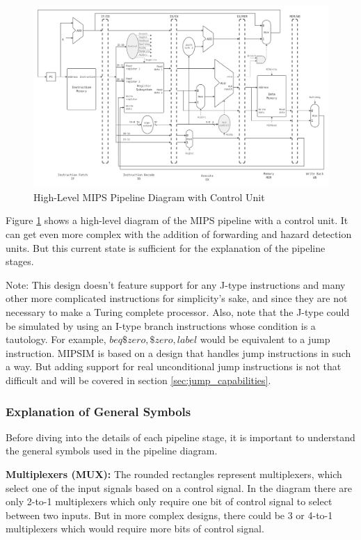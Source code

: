 \begin{figure}[H]
    \centering
    \includegraphics[width=1\textwidth]{assets/images/mips_pipeline.png}
    \caption{High-Level MIPS Pipeline Diagram with Control Unit}
    \label{fig:mips_pipeline}
\end{figure}

Figure \ref{fig:mips_pipeline} shows a high-level diagram of the MIPS pipeline with a control unit. It can get even more complex with the addition of forwarding and hazard detection units. But this current state is sufficient for the explanation of the pipeline stages.

Note: This design doesn't feature support for any J-type instructions and many other more complicated instructions for simplicity’s sake, and since they are not necessary to make a Turing complete processor. Also, note that the J-type could be simulated by using an I-type branch instructions whose condition is a tautology. For example, $beq \$zero, \$zero, label$ would be equivalent to a jump instruction. MIPSIM is based on a design that handles jump instructions in such a way. But adding support for real unconditional jump instructions is not that difficult and will be covered in section \ref{sec:jump_capabilities}.



\subsubsection{Explanation of General Symbols}
Before diving into the details of each pipeline stage, it is important to understand the general symbols used in the pipeline diagram.

\textbf{Multiplexers (MUX):} The rounded rectangles represent multiplexers, which select one of the input signals based on a control signal. In the diagram there are only 2-to-1 multiplexers which only require one bit of control signal to select between two inputs. But in more complex designs, there could be 3 or 4-to-1 multiplexers which would require more bits of control signal.

